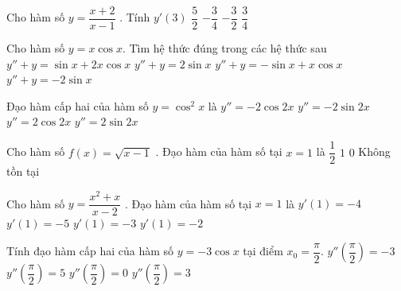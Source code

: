 	
	\begin{ex}%
		Cho hàm số $y=\dfrac{x+2}{x-1}$ . Tính $y'(3)$ 
		\choice
		{$\dfrac{5}{2}$}
		{\True $-\dfrac{3}{4}$}
		{$-\dfrac{3}{2}$}
		{$\dfrac{3}{4}$}
	\end{ex}
	
	\begin{ex}%
		Cho hàm số $ y=x\cos x$. Tìm hệ thức đúng trong các hệ thức sau
		\choice
		{$y''+y=\sin x+2x\cos x$}
		{$y''+y=2\sin x$}
		{$y''+y=-\sin x+x\cos x$}
		{\True $y''+y=-2\sin x$}
	\end{ex}
	
	\begin{ex}%
		Đạo hàm cấp hai của hàm số $ y=\cos^2x$ là
		\choice
		{\True $y''=-2\cos 2x$}
		{$y''=-2\sin 2x$}
		{$y''=2\cos 2x$}
		{$y''=2\sin 2x$}
	\end{ex}
	
	\begin{ex}%
		Cho hàm số $f(x)=\sqrt{x-1}$ . Đạo hàm của hàm số tại $ x=1$ là
		\choice
		{$\dfrac{1}{2}$}
		{$1$}
		{$0$}
		{\True Không tồn tại}
	\end{ex}
	
	\begin{ex}%
		Cho hàm số $y=\dfrac{x^2+x}{x-2}$ . Đạo hàm của hàm số tại $x=1$ là
		\choice
		{$y'(1)=-4$}
		{\True $y'(1)=-5$}
		{$y'(1)=-3$}
		{$y'(1)=-2$}
	\end{ex}
	
	\begin{ex}%
		Tính đạo hàm cấp hai của hàm số $ y=-3\cos x$ tại điểm $x_0=\dfrac{\pi}{2}$.
		\choice
		{$y''\left(\dfrac{\pi}{2}\right)=-3$}
		{$y''\left(\dfrac{\pi}{2}\right)=5$}
		{\True $y''\left(\dfrac{\pi}{2}\right)=0$}
		{$y''\left(\dfrac{\pi}{2}\right)=3$}
	\end{ex}
	
